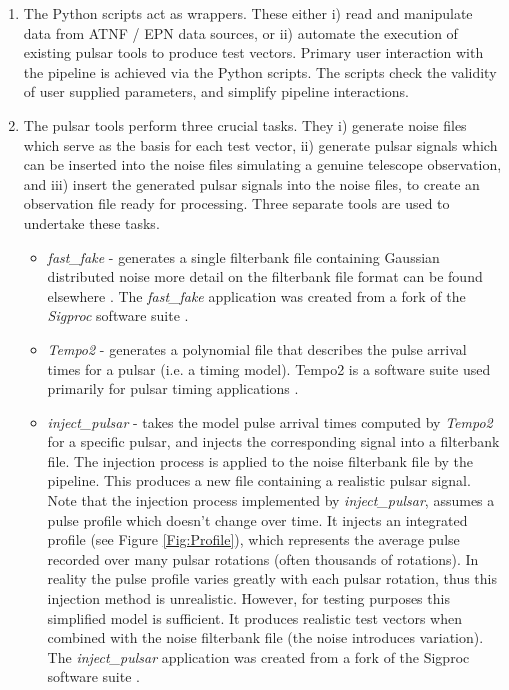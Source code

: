 \documentclass[preprint,authoryear,5p,twocolumn]{elsarticle_mod}
\begin{document}
\begin{enumerate}
\item The Python scripts act as wrappers. These either i) read and manipulate data from ATNF / EPN data sources, or ii) automate the execution of existing pulsar tools to produce test vectors. Primary user interaction with the pipeline is achieved via the Python scripts. The scripts check the validity of user supplied parameters, and simplify pipeline interactions.
\item The pulsar tools perform three crucial tasks. They i) generate noise files which serve as the basis for each test vector, ii) generate pulsar signals which can be inserted into the noise files simulating a genuine telescope observation, and iii) insert the generated pulsar signals into the noise files, to create an observation file ready for processing. Three separate tools are used to undertake these tasks. 
\begin{itemize}
\item \textit{fast\_fake} - generates a single filterbank file containing Gaussian distributed noise more detail on the filterbank file format can be found elsewhere \citep{SIGPROC}. The \textit{fast\_fake} application \citep{FASTFAKE} was created from a fork of the \textit{Sigproc} software suite \citep{SIGPROC}.
\item \textit{Tempo2} - generates a polynomial file that describes the pulse arrival times for a pulsar (i.e. a timing model). Tempo2 is a software suite used primarily for pulsar timing applications \citep{Tempo2,Tempo22}.  
\item \textit{inject\_pulsar} -  takes the model pulse arrival times computed by \textit{Tempo2} for a specific pulsar, and injects the corresponding signal into a filterbank file. The injection process is applied to the noise filterbank file by the pipeline. This produces a new file containing a realistic pulsar signal. Note that the injection process implemented by \textit{inject\_pulsar}, assumes a pulse profile which doesn't change over time. It injects an integrated profile (see Figure \ref{Fig:Profile}), which represents the average pulse recorded over many pulsar rotations (often thousands of rotations). In reality the pulse profile varies greatly with each pulsar rotation, thus this injection method is unrealistic. However, for testing purposes this simplified model is sufficient. It produces realistic test vectors when combined with the noise filterbank file (the noise introduces variation).  The \textit{inject\_pulsar} application was created from a fork of the Sigproc software suite \citep{FASTFAKE}. 

\end{itemize}
\end{enumerate}
\end{document}
